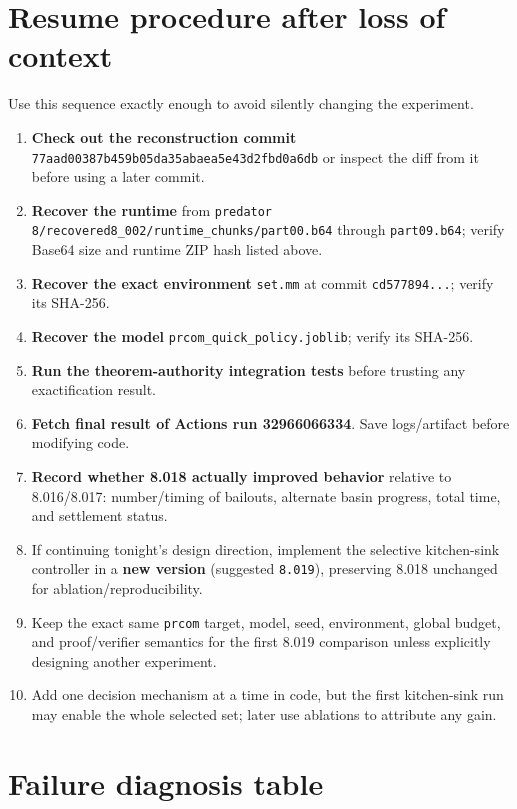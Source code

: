 \documentclass[11pt]{article}
\newcommand{\code}[1]{\texttt{#1}}
\begin{document}
\section{Resume procedure after loss of context}

Use this sequence exactly enough to avoid silently changing the experiment.

\begin{enumerate}
\item \textbf{Check out the reconstruction commit} \code{77aad00387b459b05da35abaea5e43d2fbd0a6db} or inspect the diff from it before using a later commit.
\item \textbf{Recover the runtime} from \code{predator 8/recovered8\_002/runtime\_chunks/part00.b64} through \code{part09.b64}; verify Base64 size and runtime ZIP hash listed above.
\item \textbf{Recover the exact environment} \code{set.mm} at commit \code{cd577894...}; verify its SHA-256.
\item \textbf{Recover the model} \code{prcom\_quick\_policy.joblib}; verify its SHA-256.
\item \textbf{Run the theorem-authority integration tests} before trusting any exactification result.
\item \textbf{Fetch final result of Actions run 32966066334}. Save logs/artifact before modifying code.
\item \textbf{Record whether 8.018 actually improved behavior} relative to 8.016/8.017: number/timing of bailouts, alternate basin progress, total time, and settlement status.
\item If continuing tonight's design direction, implement the selective kitchen-sink controller in a \textbf{new version} (suggested \code{8.019}), preserving 8.018 unchanged for ablation/reproducibility.
\item Keep the exact same \code{prcom} target, model, seed, environment, global budget, and proof/verifier semantics for the first 8.019 comparison unless explicitly designing another experiment.
\item Add one decision mechanism at a time in code, but the first kitchen-sink run may enable the whole selected set; later use ablations to attribute any gain.
\end{enumerate}

\section{Failure diagnosis table}
\end{document}
